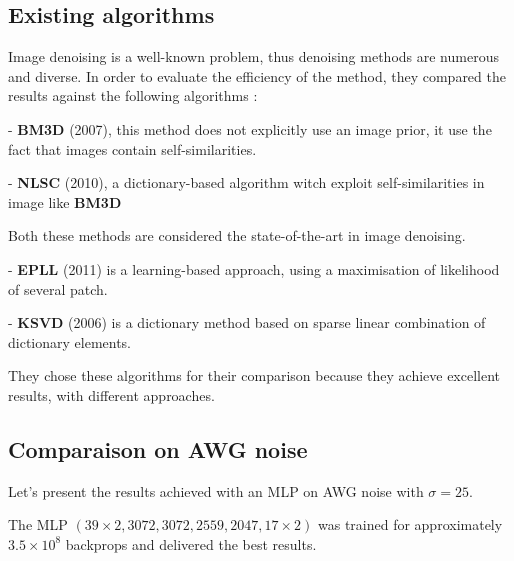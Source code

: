 \documentclass[10pt,a4paper]{article}
\newcommand{\svs}{\vspace{9pt}}
\begin{document}


\subsection{Existing algorithms}

Image denoising is a well-known problem, thus denoising methods are numerous and diverse. In order to evaluate the efficiency of the method, they compared the results against the following algorithms :

\svs
- \textbf{BM3D} (2007), this method does not explicitly use an image prior, it use the fact that images contain self-similarities.
\svs

- \textbf{NLSC} (2010), a dictionary-based algorithm witch exploit self-similarities in image like \textbf{BM3D}

\svs

Both these methods are considered the state-of-the-art in image denoising.

\svs

- \textbf{EPLL} (2011) is a learning-based approach, using a maximisation of likelihood of several patch.

\svs

- \textbf{KSVD} (2006) is a dictionary method based on sparse linear combination of dictionary elements.
\svs

They chose these algorithms for their comparison because they achieve excellent results, with different approaches.

\subsection{Comparaison on AWG noise}

Let's present the results achieved with an MLP on AWG noise with $\sigma=25$.

\svs 

The MLP $(39 \times 2, 3072, 3072, 2559, 2047, 17 \times 2)$ was trained for approximately $3.5 \times 10^8$ backprops and delivered the best results.

\svs 
\end{document}
